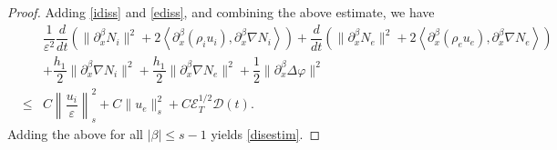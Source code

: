 \documentclass[reqno,twoside,12pt,a4paper]{amsart}
\newcommand{\eps}{\mathbb{\varepsilon}}
\newcommand{\pa}{\partial}
\newcommand{\vp}{\varphi}
\numberwithin{equation}{section}
\begin{document}
\begin{proof}
Adding \eqref{idiss} and \eqref{ediss}, and combining the above estimate, we have
\begin{eqnarray*}
&\,&\dfrac{1}{\eps^2}\dfrac{d}{dt}\left( \|\pa_x^\beta N_i\|^2+2\left<\pa_x^\beta (\rho_iu_i), \pa_x^\beta \nabla N_i \right>\right)+\dfrac{d}{dt}\left( \|\pa_x^\beta N_e\|^2+2\left<\pa_x^\beta (\rho_e u_e), \pa_x^\beta \nabla N_e \right>\right)\nonumber\\
&\,&+\dfrac{h_1}{2}\|\pa_x^\beta\nabla N_i\|^2+\dfrac{h_1}{2}\|\pa_x^\beta\nabla N_e\|^2+\dfrac{1}{2}\|\pa_x^\beta\Delta \vp\|^2\nonumber\\
&\leq &C\left\|\dfrac{u_i}{\eps}\right\|_s^2+C\|u_e\|_s^2+C\mathscr{E}_T^{1/2}\mathscr{D}(t).
\end{eqnarray*}
Adding the above for all $|\beta|\leq s-1$ yields \eqref{disestim}. 
\end{proof}
\end{document}
